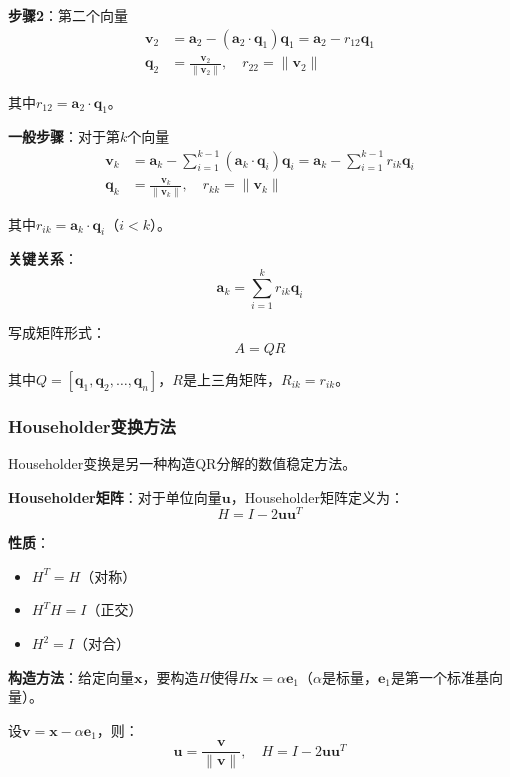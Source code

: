 \documentclass[12pt,a4paper]{article}
\begin{document}
\textbf{步骤2}：第二个向量
\begin{align}
\bm{v}_2 &= \bm{a}_2 - (\bm{a}_2 \cdot \bm{q}_1) \bm{q}_1 = \bm{a}_2 - r_{12} \bm{q}_1 \\
\bm{q}_2 &= \frac{\bm{v}_2}{\|\bm{v}_2\|}, \quad r_{22} = \|\bm{v}_2\|
\end{align}

其中$r_{12} = \bm{a}_2 \cdot \bm{q}_1$。

\textbf{一般步骤}：对于第$k$个向量
\begin{align}
\bm{v}_k &= \bm{a}_k - \sum_{i=1}^{k-1} (\bm{a}_k \cdot \bm{q}_i) \bm{q}_i = \bm{a}_k - \sum_{i=1}^{k-1} r_{ik} \bm{q}_i \\
\bm{q}_k &= \frac{\bm{v}_k}{\|\bm{v}_k\|}, \quad r_{kk} = \|\bm{v}_k\|
\end{align}

其中$r_{ik} = \bm{a}_k \cdot \bm{q}_i$（$i < k$）。

\textbf{关键关系}：
\begin{equation}
\bm{a}_k = \sum_{i=1}^{k} r_{ik} \bm{q}_i
\end{equation}

写成矩阵形式：
\begin{equation}
A = QR
\end{equation}

其中$Q = [\bm{q}_1, \bm{q}_2, \ldots, \bm{q}_n]$，$R$是上三角矩阵，$R_{ik} = r_{ik}$。

\subsubsection{Householder变换方法}

Householder变换是另一种构造QR分解的数值稳定方法。

\textbf{Householder矩阵}：对于单位向量$\bm{u}$，Householder矩阵定义为：
\begin{equation}
H = I - 2\bm{u}\bm{u}^T
\end{equation}

\textbf{性质}：
\begin{itemize}
\item $H^T = H$（对称）
\item $H^T H = I$（正交）
\item $H^2 = I$（对合）
\end{itemize}

\textbf{构造方法}：给定向量$\bm{x}$，要构造$H$使得$H\bm{x} = \alpha \bm{e}_1$（$\alpha$是标量，$\bm{e}_1$是第一个标准基向量）。

设$\bm{v} = \bm{x} - \alpha \bm{e}_1$，则：
\begin{equation}
\bm{u} = \frac{\bm{v}}{\|\bm{v}\|}, \quad H = I - 2\bm{u}\bm{u}^T
\end{equation}
\end{document}

